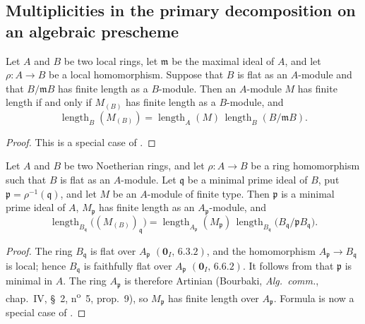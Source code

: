 \subsection{Multiplicities in the primary decomposition on an algebraic prescheme}
\label{subsection:IV.4.7}

\begin{lemma}[4.7.1]
\label{IV.4.7.1}
Let $A$ and $B$ be two local rings, let $\mathfrak m$ be the maximal
ideal of $A$, and let $\rho:A\to B$ be a local homomorphism.
Suppose that $B$ is flat as an $A$-module and that $B/\mathfrak mB$
has finite length as a $B$-module.
Then an $A$-module $M$ has finite length if and only if $M_{(B)}$ has
finite length as a $B$-module, and
\begin{equation}
\operatorname{length}_B(M_{(B)})
=\operatorname{length}_A(M)\,
 \operatorname{length}_B(B/\mathfrak mB).
\tag{4.7.1.1}
\label{IV.4.7.1.1}
\end{equation}
\end{lemma}

\begin{proof}
This is a special case of .
\end{proof}

\begin{corollary}[4.7.2]
\label{IV.4.7.2}
Let $A$ and $B$ be two Noetherian rings, and let
$\rho:A\to B$ be a ring homomorphism such that $B$ is flat as an
$A$-module.
Let $\mathfrak q$ be a minimal prime ideal of $B$, put
$\mathfrak p=\rho^{-1}(\mathfrak q)$, and let $M$ be an $A$-module
of finite type.
Then $\mathfrak p$ is a minimal prime ideal of $A$,
$M_{\mathfrak p}$ has finite length as an $A_{\mathfrak p}$-module,
and
\begin{equation}
\operatorname{length}_{B_{\mathfrak q}}
 \bigl((M_{(B)})_{\mathfrak q}\bigr)
=
\operatorname{length}_{A_{\mathfrak p}}(M_{\mathfrak p})\,
\operatorname{length}_{B_{\mathfrak q}}
 \bigl(B_{\mathfrak q}/\mathfrak pB_{\mathfrak q}\bigr).
\tag{4.7.2.1}
\label{IV.4.7.2.1}
\end{equation}
\end{corollary}

\begin{proof}
The ring $B_{\mathfrak q}$ is flat over $A_{\mathfrak p}$
$(\mathbf 0_I,\,6.3.2)$, and the homomorphism
$A_{\mathfrak p}\to B_{\mathfrak q}$ is local; hence
$B_{\mathfrak q}$ is faithfully flat over $A_{\mathfrak p}$
$(\mathbf 0_I,\,6.6.2)$.
It follows from  that $\mathfrak p$ is minimal in $A$.
The ring $A_{\mathfrak p}$ is therefore Artinian
(Bourbaki, \emph{Alg.\ comm.}, chap.~IV, \S~2,
n\textsuperscript{o}~5, prop.~9), so $M_{\mathfrak p}$ has finite
length over $A_{\mathfrak p}$.
Formula  is now a special case of
.
\end{proof}

